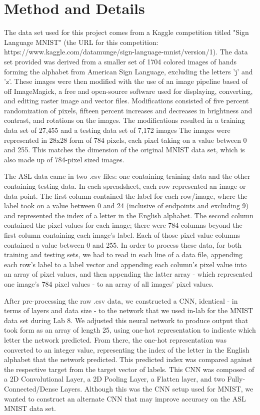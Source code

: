 \documentclass[11pt]{article}
\begin{document}
\section{Method and Details}

\par
The data set used for this project comes from a Kaggle competition titled "Sign Language MNIST" (the URL for this competition: https://www.kaggle.com/datamunge/sign-language-mnist/version/1). The data set provided was derived from a smaller set of 1704 colored images of hands forming the alphabet from American Sign Language, excluding the letters 'j' and 'z'. These images were then modified with the use of an image pipeline based of off ImageMagick, a free and open-source software used for displaying, converting, and editing raster image and vector files. Modifications consisted of five percent randomization of pixels, fifteen percent increases and decreases in brightness and contrast, and rotations on the images. The modifications resulted in a training data set of 27,455 and a testing data set of 7,172 images The images were represented in 28x28 form of 784 pixels, each pixel taking on a value between 0 and 255. This matches the dimension of the original MNIST data set, which is also made up of 784-pixel sized images.

The ASL data came in two .csv files: one containing training data and the other containing testing data. In each spreadsheet, each row represented an image or data point. The first column contained the label for each row/image, where the label took on a value between 0 and 24 (inclusive of endpoints and excluding 9) and represented the index of a letter in the English alphabet. The second column contained the pixel values for each image; there were 784 columns beyond the first column containing each image's label. Each of those pixel value columns contained a value between 0 and 255. In order to process these data, for both training and testing sets, we had to read in each line of a data file, appending each row's label to a label vector and appending each column's pixel value into an array of pixel values, and then appending the latter array - which represented one image's 784 pixel values - to an array of all images' pixel values.

After pre-processing the raw .csv data, we constructed a CNN, identical - in terms of layers and data size - to the network that we used in-lab for the MNIST data set during Lab 8. We adjusted this neural network to produce output that took form as an array of length 25, using one-hot representation to indicate which letter the network predicted. From there, the one-hot representation was converted to an integer value, representing the index of the letter in the English alphabet that the network predicted. This predicted index was compared against the respective target from the target vector of labels. This CNN was composed of a 2D Convolutional Layer, a 2D Pooling Layer, a Flatten layer, and two Fully-Connected/Dense Layers. Although this was the CNN setup used for MNIST, we wanted to construct an alternate CNN that may improve accuracy on the ASL MNIST data set.
\end{document}
